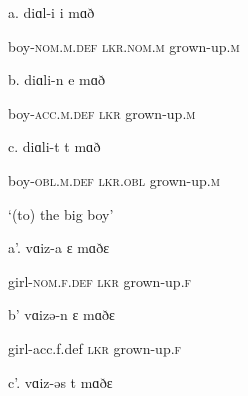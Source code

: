 \documentclass[output=paper]{langsci/langscibook}
\begin{document}
\begin{styleSfondomedioiColorexxi}
a.  diɑl-i      i     mɑð           
\end{styleSfondomedioiColorexxi}

\begin{styleSfondomedioiColorexxi}
    boy-\textsc{nom.m.def}   \textsc{lkr.nom.m}  grown-up.\textsc{m}
\end{styleSfondomedioiColorexxi}

\begin{styleSfondomedioiColorexxi}
  b.  diɑli-n     e     mɑð    
\end{styleSfondomedioiColorexxi}

\begin{styleSfondomedioiColorexxi}
boy-\textsc{acc.m.def     lkr}    grown-up.\textsc{m}
\end{styleSfondomedioiColorexxi}

\begin{styleSfondomedioiColorexxi}
c.  diɑli-t              t     mɑð  
\end{styleSfondomedioiColorexxi}

\begin{styleSfondomedioiColorexxi}
boy-\textsc{obl.m.def}  \textsc{lkr.obl}  grown-up.\textsc{m}
\end{styleSfondomedioiColorexxi}

\begin{styleSfondomedioiColorexxi}
‘(to) the big boy’
\end{styleSfondomedioiColorexxi}

\begin{styleSfondomedioiColorexxi}
  a’.  vɑiz-a     ɛ     mɑðɛ    
\end{styleSfondomedioiColorexxi}

\begin{styleSfondomedioiColorexxi}
    girl-\textsc{nom.f.def}   \textsc{lkr}    grown-up.\textsc{f}   
\end{styleSfondomedioiColorexxi}

\begin{styleSfondomedioiColorexxi}
b’  vɑizə-n     ɛ     mɑðɛ    
\end{styleSfondomedioiColorexxi}

\begin{styleSfondomedioiColorexxi}
girl-acc.f.def    \textsc{lkr}    grown-up.\textsc{f}
\end{styleSfondomedioiColorexxi}

\begin{styleSfondomedioiColorexxi}
c’.  vɑiz-əs    t     mɑðɛ 
\end{styleSfondomedioiColorexxi}
\end{document}
